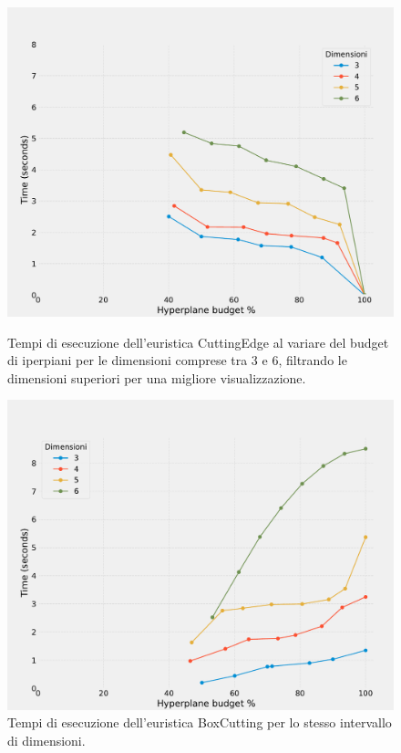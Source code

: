 \begin{figure}[H]
    \centering
    \begin{minipage}[b]{0.45\textwidth}
        \centering
        \includegraphics[width=\textwidth]{media/report_ndim/ndim_time_diff_CE_under7.pdf}
        \caption{Tempi di esecuzione dell'euristica CuttingEdge al variare 
        del budget di iperpiani per le dimensioni comprese tra 3 e 6, 
        filtrando le dimensioni superiori per una migliore visualizzazione.}
        \label{fig: disp_ce_sub7}
    \end{minipage}
    \hspace{0.05\textwidth}  %
    \begin{minipage}[b]{0.45\textwidth}
        \centering
        \includegraphics[width=\textwidth]{media/report_ndim/ndim_time_diff_BC_under7.pdf}
        \caption{Tempi di esecuzione dell'euristica BoxCutting per lo stesso 
        intervallo di dimensioni.\\
        \\}
        \label{fig: disp_bc_sub7}
    \end{minipage}
\end{figure}

